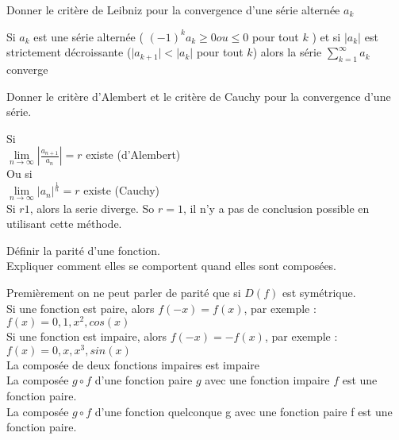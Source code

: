 \documentclass[12pt]{article}
\newcommand*{\xfield}[1]{\begin{mdframed}\centering #1\end{mdframed}\bigskip}
\newenvironment{note}{}{}
\begin{document}
\begin{note}
	\xfield{Donner le critère de Leibniz pour la convergence d'une série alternée $a_k$}
	\xfield{Si $a_k$ est une série alternée ( $(-1)^k a_k \ge 0 ou \le 0$ pour tout $k$ ) et si $\vert a_k \vert$ est strictement décroissante ($\vert a_{k+1} \vert < \vert a_k \vert$ pour tout $k$) alors la série $\sum\limits^{\infty}_{k=1} a_k$ converge}
\end{note}

\begin{note}
    \xfield{Donner le critère d'Alembert et le critère de Cauchy pour la convergence d'une série.}
    \xfield{
        Si\\
        $\lim\limits_{n \to \infty} \left|\frac{a_{n+1}}{a_n}\right| = r$ existe (d'Alembert)\\
        Ou si\\
        $\lim\limits_{n \to \infty} \left|a_n\right|^{\frac{1}{n}} = r$ existe (Cauchy)\\
        Si $r  1$, alors la serie diverge. So $r = 1$, il n'y a pas de conclusion possible en utilisant cette méthode.
    }
\end{note}

\begin{note}
    \xfield{
        Définir la parité d'une fonction.\\
        Expliquer comment elles se comportent quand elles sont composées.
    }
    \xfield{
        Premièrement on ne peut parler de parité que si $D(f)$ est symétrique.\\
        Si une fonction est paire, alors $f(-x) = f(x)$, par exemple : $f(x) = 0,1 , x^2, cos(x)$\\
        Si une fonction est impaire, alors $f(-x) = -f(x)$, par exemple : $f(x) = 0,x,x^3,sin(x)$\\
        La composée de deux fonctions impaires est impaire\\
        La composée $g \circ f$ d'une fonction paire $g$ avec une fonction impaire $f$ est une fonction paire.\\
        La composée $g \circ f$ d'une fonction quelconque g avec une fonction paire f est une fonction paire.}
\end{note}
\end{document}
